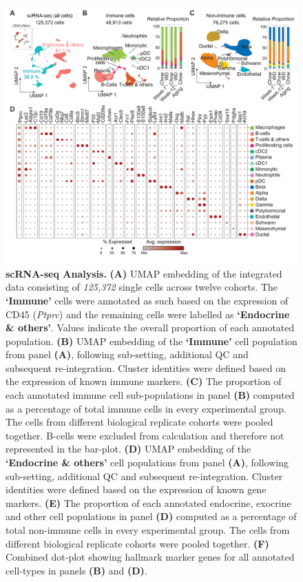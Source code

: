\begin{figure}[H]
\centering
\includegraphics[width=\linewidth]{Chapter4/Fig/F2-3-01.png}
\caption[res-scR]{\textbf{scRNA-seq Analysis.} \textbf{(A)} UMAP embedding of the integrated data consisting of \textit{125,372} single cells across twelve cohorts. The \textbf{‘Immune’} cells were annotated as such based on the expression of CD45 (\textit{Ptprc}) and the remaining cells were labelled as \textbf{‘Endocrine \& others’}. Values indicate the overall proportion of each annotated population. \textbf{(B)} UMAP embedding of the \textbf{‘Immune’} cell population from panel \textbf{(A)}, following sub-setting, additional QC and subsequent re-integration. Cluster identities were defined based on the expression of known immune markers. \textbf{(C)} The proportion of each annotated immune cell sub-populations in panel \textbf{(B)} computed as a percentage of total immune cells in every experimental group. The cells from different biological replicate cohorts were pooled together. B-cells were excluded from calculation and therefore not represented in the bar-plot. \textbf{(D)} UMAP embedding of the \textbf{‘Endocrine \& others’} cell populations from panel \textbf{(A)}, following sub-setting, additional QC and subsequent re-integration. Cluster identities were defined based on the expression of known gene markers. \textbf{(E)} The proportion of each annotated endocrine, exocrine and other cell populations in panel \textbf{(D)} computed as a percentage of total non-immune cells in every experimental group. The cells from different biological replicate cohorts were pooled together. \textbf{(F)} Combined dot-plot showing hallmark  marker genes for all annotated cell-types in panels \textbf{(B)} and \textbf{(D)}.}
\label{fig2-3}
\end{figure}


